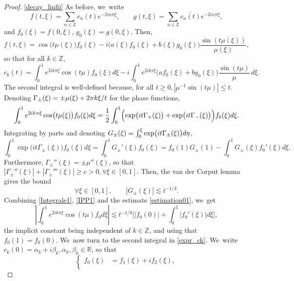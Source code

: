 \documentclass[JEP,XML,SOM,Unicode,NoFloatCountersInSection,published]{cedram}
\theoremstyle{definition}
\let\EE\exp
\let\dis\relax
\let\ov\overline
\newcommand\R{\mathbb R}
\newcommand\Z{\mathbb Z}
\newcommand{\bbpac}[1]{\biggl[#1\biggr]}
\newcommand{\abs}[1]{\left|#1\right|}
\begin{document}
\begin{proof}
\eqref{decay_linfii} As before, we~write
\[
{f}(t,\xi) = \sum_{n\in \Z} c_n(t) e^{-2in\pi\xi}, \qquad {g}(t,\xi) = \sum_{n\in \Z} \ov{c_n(t)} e^{-2in\pi\xi},
\]
and ${f}_0(\xi) = {f}(0,\xi)$, ${g}_0(\xi) = {g}(0,\xi)$. Then,
\[
{f}(t,\xi) = \cos\bigl(t\mu(\xi)\bigr) {f}_0(\xi) -i\bigl(a(\xi){f}_0(\xi)+b(\xi){g}_0(\xi)\bigr)\frac{\sin(t\mu(\xi))}{\mu(\xi)},
\]
so that for all $k\in\Z$,
\begin{equation}\label{expr_ck}
c_k(t) = \int_0^1 e^{2ik\pi\xi}\cos(t\mu){f}_0(\xi) d\xi - i\int_0^1e^{2ik\pi\xi}\bigl(a{f}_0(\xi)+b{g}_0(\xi)\bigr)\frac{\sin(t\mu)}{\mu}\,d\xi.
\end{equation}
The second integral is well-defined because, for all $t \geq 0, \abs{ \mu^{-1}{\sin(t\mu)}} \leq t$. Denoting $\dis \Gamma_\pm(\xi) = \pm \mu(\xi) + {2\pi}k\xi/t$ for the phase functions,
\begin{equation}\label{Integrale1}
\int_0^1 e^{2ik\pi\xi}\cos\bigl(t\mu(\xi)\bigr){f}_0(\xi)d\xi = \frac12\int_0^1 \Bigl(\EE\bigl(it\Gamma_+(\xi)\bigr)+ \EE\bigl(it\Gamma_-(\xi)\bigr) \Bigr){f}_0(\xi)d\xi.
\end{equation}
Integrating by parts and denoting $\dis G_\pm(\xi) = \int_0^\xi \EE\bigl(it\Gamma_\pm(\xi)\bigr) d\eta$,
\begin{equation}\label{IPP1}
\int_0^1 \EE\bigl(it\Gamma_\pm(\xi)\bigr){f}_0(\xi)d\xi = \int_0^1G_\pm'(\xi){f}_0(\xi) = {f}_0(1)G_\pm(1) - \int_0^1G_\pm(\xi){f}_0'(\xi)d\xi.
\end{equation}
Furthermore, $\Gamma_\pm''(\xi) = \pm\mu''(\xi)$, so that $\abs{\Gamma_\pm''(\xi) } + \abs{\Gamma_\pm'''(\xi) } \geq c > 0, \forall \xi \in [0,1]$. Then, the van der Corput lemma gives the bound
\begin{equation}\label{estimation01}
\forall \xi \in [0,1], \qquad |G_\pm(\xi)| \lesssim {t^{-1/3}}.
\end{equation}
Combining \eqref{Integrale1}, \eqref{IPP1} and the estimate \eqref{estimation01}, we~get
\begin{equation}\label{Int1}
\abs{\int_0^1 e^{2ik\pi\xi}\cos(t\mu){f}_0d\xi} \lesssim {t^{-1/3}} \bbpac{|{f}_0(0)| + \int_0^1|{f}_0'(\xi)|d\xi},
\end{equation}
the implicit constant being independent of $k \in \Z$, and using that ${f}_0(1)={f}_0(0)$. We~now turn to the second integral in \eqref{expr_ck}. We~write $c_k(0) = \alpha_k + i\beta_k, \alpha_k,\beta_k \in \R$, so that
\begin{equation*}
\left\{
\begin{aligned}
{f}_0(\xi) & = {f}_1(\xi) + i{f}_2(\xi), \\[2pt]

\end{aligned}
\end{equation*}
\end{proof}
\end{document}
